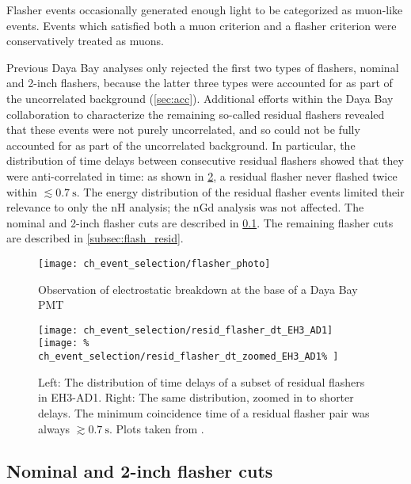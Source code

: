 Flasher events occasionally generated enough light to be categorized as muon-like events.
Events which satisfied both a muon criterion and a flasher criterion
were conservatively treated as muons.

Previous Daya Bay analyses only rejected the first two types of flashers,
nominal and 2-inch flashers,
because the latter three types were accounted for
as part of the uncorrelated background (\cref{sec:acc}).
Additional efforts within the Daya Bay collaboration
to characterize the remaining so-called residual flashers
revealed that these events were not purely uncorrelated,
and so could not be fully accounted for as part of the uncorrelated background.
In particular, the distribution of time delays
between consecutive residual flashers
showed that they were anti-correlated in time:
as shown in \cref{fig:flasher_anticorr},
a residual flasher never flashed twice within $\lesssim \SI{0.7}{\s}$.
The energy distribution of the residual flasher events
limited their relevance to only the nH analysis; the nGd analysis was not affected.
The nominal and 2-inch flasher cuts are described in \cref{subsec:flash_nominal}.
The remaining flasher cuts are described in \cref{subsec:flash_resid}.

\begin{figure}
    \centering
    \texttt{[image: ch\_event\_selection/flasher\_photo]}
    \caption[Photograph of flashing PMT]{
        Observation of electrostatic breakdown at the base of a Daya Bay PMT
        \cite{flasherphotos_docdb}
    }
    \label{fig:flasher_photo}
\end{figure}

\begin{figure}
    \centering
    \texttt{[image: ch\_event\_selection/resid\_flasher\_dt\_EH3\_AD1]}
    \texttt{[image: \%
        ch\_event\_selection/resid\_flasher\_dt\_zoomed\_EH3\_AD1\%
    ]}
    \caption[Residual flasher $\Delta t$ distribution]{
        Left: The distribution of time delays
        of a subset of residual flashers in EH3-AD1.
        Right: The same distribution, zoomed in to shorter delays.
        The minimum coincidence time of a residual flasher pair was always
        $\gtrsim \SI{0.7}{\s}$.
        Plots taken from \cite{beda_resid_flasher_dt}.
    }
    \label{fig:flasher_anticorr}
\end{figure}

\subsection{Nominal and 2-inch flasher cuts}
\label{subsec:flash_nominal}

